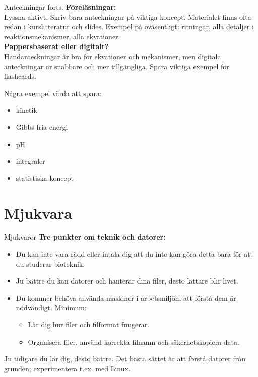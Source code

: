 \documentclass[presentation]{beamer}
\begin{document}
  \begin{frame}{Anteckningar forts.}
  \textbf{Föreläsningar:} \\
  Lyssna aktivt. Skriv bara anteckningar på viktiga koncept. Materialet finns ofta redan i kurslitteratur och slides. Exempel på oväsentligt: ritningar, alla detaljer i reaktionsmekanismer, alla ekvationer. \\
  \textbf{Pappersbaserat eller digitalt?} \\
  Handanteckningar är bra för ekvationer och mekanismer, men digitala anteckningar är snabbare och mer tillgängliga. Spara viktiga exempel för flashcards.

  Några exempel värda att spara:
  \begin{itemize}
    \item kinetik
    \item Gibbs fria energi
    \item pH
    \item integraler
    \item statistiska koncept
\end{itemize}
\end{frame}

\section{Mjukvara}
\begin{frame}{Mjukvaror}
  \textbf{Tre punkter om teknik och datorer:}
  \begin{itemize}
    \item Du kan inte vara rädd eller intala dig att du inte kan göra detta bara för att du studerar bioteknik.
    \item Ju bättre du kan datorer och hanterar dina filer, desto lättare blir livet.
    \item Du kommer behöva använda maskiner i arbetsmiljön, att förstå dem är nödvändigt. Minimum:
      \begin{itemize}
        \item Lär dig hur filer och filformat fungerar.
        \item Organisera filer, använd korrekta filnamn och säkerhetskopiera data.
      \end{itemize}
  \end{itemize}
  Ju tidigare du lär dig, desto bättre. Det bästa sättet är att förstå datorer från grunden; experimentera t.ex. med Linux.

\end{frame}
\end{document}
